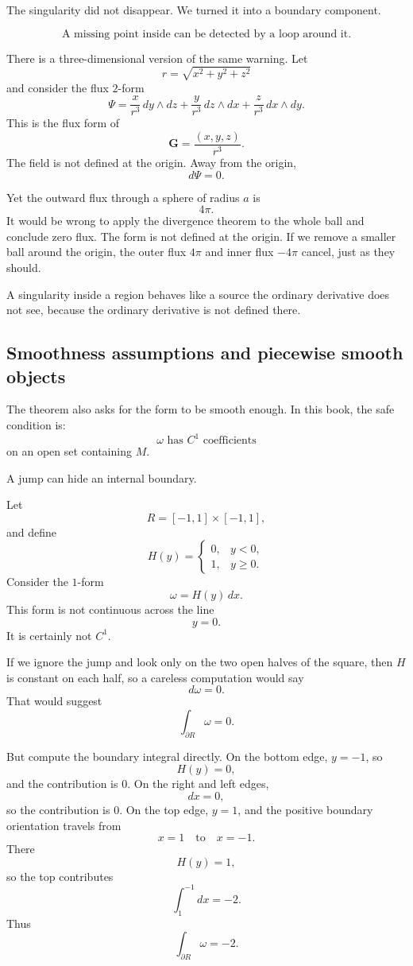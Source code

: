 The singularity did not disappear.  We turned it into a boundary component.

\[
\boxed{
    \text{A missing point inside can be detected by a loop around it.}
}
\]

There is a three-dimensional version of the same warning.  Let
\[
    r=\sqrt{x^2+y^2+z^2}
\]
and consider the flux \(2\)-form
\[
    \Psi=
    \frac{x}{r^3}\,dy\wedge dz
    +
    \frac{y}{r^3}\,dz\wedge dx
    +
    \frac{z}{r^3}\,dx\wedge dy.
\]
This is the flux form of
\[
    \mathbf G=\frac{(x,y,z)}{r^3}.
\]
The field is not defined at the origin.  Away from the origin,
\[
    d\Psi=0.
\]

Yet the outward flux through a sphere of radius \(a\) is
\[
    4\pi.
\]
It would be wrong to apply the divergence theorem to the whole ball and conclude
zero flux.  The form is not defined at the origin.  If we remove a smaller ball around
the origin, the outer flux \(4\pi\) and inner flux \(-4\pi\) cancel, just as they should.

A singularity inside a region behaves like a source the ordinary derivative does not see,
because the ordinary derivative is not defined there.

\subsection{Smoothness assumptions and piecewise smooth objects}

The theorem also asks for the form to be smooth enough.  In this book, the safe
condition is:
\[
    \omega\text{ has }C^1\text{ coefficients}
\]
on an open set containing \(M\).

A jump can hide an internal boundary.

Let
\[
    R=[-1,1]\times[-1,1],
\]
and define
\[
    H(y)=
    \begin{cases}
    0, & y<0,\\
    1, & y\ge 0.
    \end{cases}
\]
Consider the \(1\)-form
\[
    \omega=H(y)\,dx.
\]
This form is not continuous across the line
\[
    y=0.
\]
It is certainly not \(C^1\).

If we ignore the jump and look only on the two open halves of the square, then \(H\)
is constant on each half, so a careless computation would say
\[
    d\omega=0.
\]
That would suggest
\[
    \int_{\partial R}\omega=0.
\]

But compute the boundary integral directly.  On the bottom edge, \(y=-1\), so
\[
    H(y)=0,
\]
and the contribution is \(0\).  On the right and left edges,
\[
    dx=0,
\]
so the contribution is \(0\).  On the top edge, \(y=1\), and the positive boundary
orientation travels from
\[
    x=1
    \quad\text{to}\quad
    x=-1.
\]
There
\[
    H(y)=1,
\]
so the top contributes
\[
    \int_1^{-1}dx=-2.
\]
Thus
\[
\boxed{
    \int_{\partial R}\omega=-2.
}
\]


